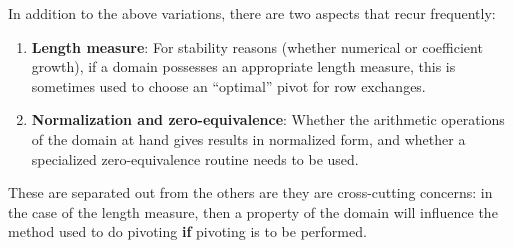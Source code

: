 \documentclass{llncs}
\begin{document}
\noindent In addition to the above variations, there are two aspects that 
recur frequently:
\begin{enumerate}
	\item \textbf{Length measure}:  For stability reasons
		(whether numerical or coefficient growth), if a domain possesses
		an appropriate length measure, this is sometimes used to choose
		an ``optimal'' pivot for row exchanges.
	\item \textbf{Normalization and zero-equivalence}: Whether the 
		arithmetic operations of the domain at hand gives results in 
		normalized form, and whether a specialized zero-equivalence 
		routine needs to be used.
\end{enumerate}
\noindent These are separated out from the others are they are cross-cutting
concerns: in the case of the length measure, then a property of the domain
will influence the method used to do pivoting \textbf{if} pivoting is to be
performed.
\end{document}
